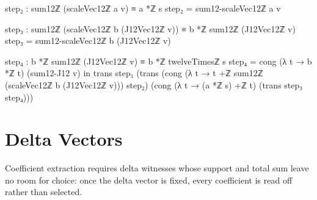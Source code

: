 \documentclass[11pt,a4paper]{book}
\begin{document}
\begin{code}
    step₂ : sum12ℤ (scaleVec12ℤ a v) ≡ a *ℤ s
    step₂ = sum12-scaleVec12ℤ a v

    step₃ : sum12ℤ (scaleVec12ℤ b (J12Vec12ℤ v)) ≡ b *ℤ sum12ℤ (J12Vec12ℤ v)
    step₃ = sum12-scaleVec12ℤ b (J12Vec12ℤ v)

    step₄ : b *ℤ sum12ℤ (J12Vec12ℤ v) ≡ b *ℤ twelveTimesℤ s
    step₄ = cong (λ t → b *ℤ t) (sum12-J12 v)
  in
  trans
    step₁
    (trans
      (cong (λ t → t +ℤ sum12ℤ (scaleVec12ℤ b (J12Vec12ℤ v))) step₂)
      (cong (λ t → (a *ℤ s) +ℤ t) (trans step₃ step₄)))
\end{code}

\section{Delta Vectors}

Coefficient extraction requires delta witnesses whose support and total sum
leave no room for choice: once the delta vector is fixed, every coefficient
is read off rather than selected.
\end{document}
